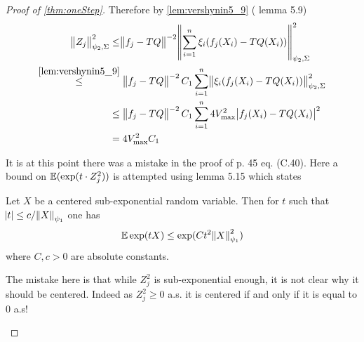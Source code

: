 \begin{proof}[Proof of \cref{thm:oneStep}]
  Therefore by \cref{lem:vershynin5_9} ( lemma 5.9)
  \begin{align}
    \norm{Z_j}_{\psi_2, \Sigma}^2
    \leq & \norm{f_j - TQ}^{-2}
    \norm{\sum_{i=1}^n \xi_i (f_j(X_i) - TQ(X_i))}_{\psi_2, \Sigma}^2
    \\ \stackrel{\ref{lem:vershynin5_9}}{\leq}
    &\; \norm{f_j - TQ}^{-2}
    C_1 \sum_{i=1}^n \norm{\xi_i(f_j(X_i) - TQ(X_i))}_{\psi_2, \Sigma}^2
    \\ \leq &\; \norm{f_j - TQ}^{-2}
    C_1 \sum_{i=1}^n 4 V_{\max}^2 \abs{f_j(X_i) - TQ(X_i)}^2
    \\ = &\; 4 V_{\max}^2 C_1
  \end{align}

  \begin{rem}
    It is at this point there was a mistake in the proof of 
    p. 45 eq. (C.40). Here a bound on
    $\mathbb{E}(\exp(t \cdot Z_j^2))$ is attempted using
    lemma 5.15  which states
    \vspace{-0.7cm}
    \begin{adjustwidth}{10pt}{10pt}
      \begin{lem}
	Let $X$ be a centered sub-exponential random variable. Then for $t$
	such that $\abs{t} \leq c/\norm{X}_{\psi_1}$ one has
	\[ \mathbb{E} \exp(t X) \leq \exp(C t^2 \norm{X}_{\psi_1}^2) \]
	where $C, c > 0$ are absolute constants.
      \end{lem}
    \end{adjustwidth}
    The mistake here is that while $Z_j^2$ is sub-exponential enough, it
    is not clear why it should be centered.
    Indeed as $Z_j^2 \geq 0$ a.s. it is centered if and only if it is
    equal to 0 a.s!
    

\end{rem}
\end{proof}

